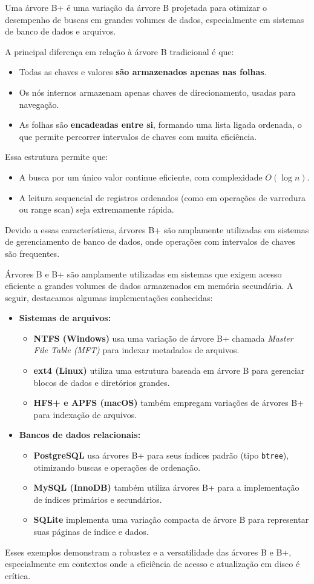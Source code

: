 Uma árvore B+ é uma variação da árvore B projetada para otimizar o desempenho de buscas em grandes volumes de dados, especialmente em sistemas de banco de dados e arquivos.

A principal diferença em relação à árvore B tradicional é que:
\begin{itemize}
  \item Todas as chaves e valores \textbf{são armazenados apenas nas folhas}.
  \item Os nós internos armazenam apenas chaves de direcionamento, usadas para navegação.
  \item As folhas são \textbf{encadeadas entre si}, formando uma lista ligada ordenada, o que permite percorrer intervalos de chaves com muita eficiência.
\end{itemize}

Essa estrutura permite que:
\begin{itemize}
  \item A busca por um único valor continue eficiente, com complexidade \( O(\log n) \).
  \item A leitura sequencial de registros ordenados (como em operações de varredura ou range scan) seja extremamente rápida.
\end{itemize}

Devido a essas características, árvores B+ são amplamente utilizadas em sistemas de gerenciamento de banco de dados, onde operações com intervalos de chaves são frequentes.

Árvores B e B+ são amplamente utilizadas em sistemas que exigem acesso eficiente a grandes volumes de dados armazenados em memória secundária. 
A seguir, destacamos algumas implementações conhecidas:

\begin{itemize}
  \item \textbf{Sistemas de arquivos:}
  \begin{itemize}
    \item \textbf{NTFS (Windows)} usa uma variação de árvore B+ chamada \textit{Master File Table (MFT)} para indexar metadados de arquivos.
    \item \textbf{ext4 (Linux)} utiliza uma estrutura baseada em árvore B para gerenciar blocos de dados e diretórios grandes.
    \item \textbf{HFS+ e APFS (macOS)} também empregam variações de árvores B+ para indexação de arquivos.
  \end{itemize}

  \item \textbf{Bancos de dados relacionais:}
  \begin{itemize}
    \item \textbf{PostgreSQL} usa árvores B+ para seus índices padrão (tipo \texttt{btree}), otimizando buscas e operações de ordenação.
    \item \textbf{MySQL (InnoDB)} também utiliza árvores B+ para a implementação de índices primários e secundários.
    \item \textbf{SQLite} implementa uma variação compacta de árvore B para representar suas páginas de índice e dados.
  \end{itemize}
\end{itemize}

Esses exemplos demonstram a robustez e a versatilidade das árvores B e B+, especialmente em contextos onde a eficiência de acesso e atualização em disco é crítica.
